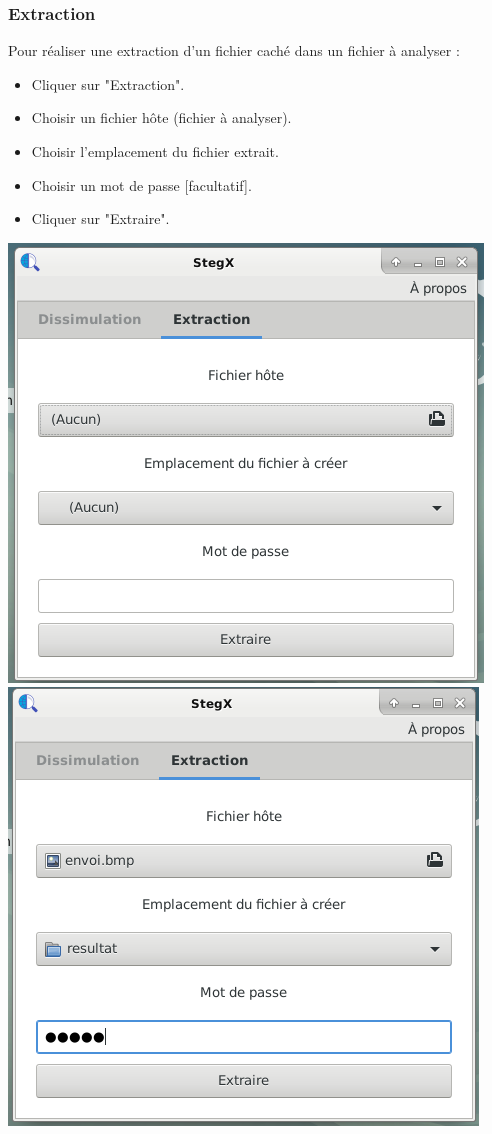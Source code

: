 \documentclass[11pt]{article}
\begin{document}
\subsubsection{Extraction}

Pour réaliser une extraction d'un fichier caché dans un fichier à analyser : 
\begin{itemize}
\item Cliquer sur "Extraction".
\item Choisir un fichier hôte (fichier à analyser). 
\item Choisir l'emplacement du fichier extrait. 
\item Choisir un mot de passe [facultatif]. 
\item Cliquer sur "Extraire". 
\end{itemize}

\vspace{0.5cm}
\hspace{-2cm}
\includegraphics[scale=0.8]{pictures/extraction_1.png}
\vspace{1cm}
\hspace{0.2cm}
\includegraphics[scale=0.8]{pictures/extraction_2.png}
\end{document}
